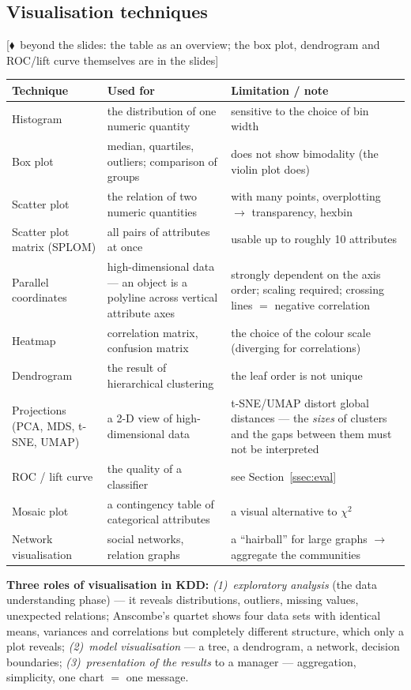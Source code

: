 \documentclass[11pt,a4paper]{article}
\theoremstyle{definition}
\providecommand{\uv}[1]{``#1''}
\newcommand{\mimoq}[1]{\textcolor{markcol}{\textsf{\footnotesize[$\blacklozenge$~beyond the slides: #1]}}}
\begin{document}
\subsection{Visualisation techniques}

\mimoq{the table as an overview; the box plot, dendrogram and ROC/lift curve themselves are in
the slides}
\begin{center}
\small
\begin{tabular}{@{}p{3.9cm}p{5.0cm}p{6.0cm}@{}}
\toprule
\textbf{Technique} & \textbf{Used for} & \textbf{Limitation / note} \\
\midrule
Histogram & the distribution of one numeric quantity & sensitive to the choice of bin width \\
Box plot & median, quartiles, outliers; comparison of groups & does not show bimodality (the
  violin plot does) \\
Scatter plot & the relation of two numeric quantities & with many points, overplotting $\to$
  transparency, hexbin \\
Scatter plot matrix (SPLOM) & all pairs of attributes at once & usable up to roughly 10
  attributes \\
Parallel coordinates & high-dimensional data --- an object is a polyline across vertical attribute
  axes & strongly dependent on the axis order; scaling required; crossing lines $=$ negative
  correlation \\
Heatmap & correlation matrix, confusion matrix & the choice of the colour scale (diverging for
  correlations) \\
Dendrogram & the result of hierarchical clustering & the leaf order is not unique \\
Projections (PCA, MDS, t-SNE, UMAP) & a 2-D view of high-dimensional data & t-SNE/UMAP distort
  global distances --- the \emph{sizes} of clusters and the gaps between them must not be
  interpreted \\
ROC / lift curve & the quality of a classifier & see Section~\ref{ssec:eval} \\
Mosaic plot & a contingency table of categorical attributes & a visual alternative to $\chi^2$ \\
Network visualisation & social networks, relation graphs & a \uv{hairball} for large graphs $\to$
  aggregate the communities \\
\bottomrule
\end{tabular}
\end{center}

\textbf{Three roles of visualisation in KDD:} \emph{(1)}~\emph{exploratory analysis} (the data
understanding phase) --- it reveals distributions, outliers, missing values, unexpected relations;
Anscombe's quartet shows four data sets with identical means, variances and correlations but
completely different structure, which only a plot reveals; \emph{(2)}~\emph{model visualisation} ---
a tree, a dendrogram, a network, decision boundaries; \emph{(3)}~\emph{presentation of the results}
to a manager --- aggregation, simplicity, one chart $=$ one message.
\end{document}

